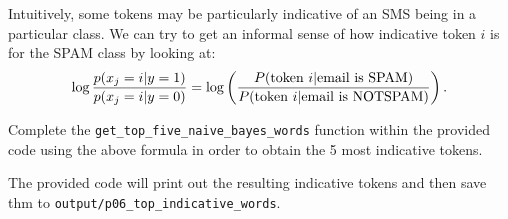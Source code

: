 \item {}
Intuitively, some tokens may be particularly indicative of an SMS being
in a particular class.  We can try to get an informal sense of how indicative
token $i$ is for the SPAM class by looking at:
\begin{equation*}
  \log \frac{p(x_j = i| y=1)}{p(x_j = i|y=0)}
  = \log\left(\frac{P(\hbox{token $i$} | \hbox{email is SPAM})}
    {P(\hbox{token $i$} | \hbox{email is NOTSPAM})}\right).
\end{equation*}

Complete the \texttt{get\_top\_five\_naive\_bayes\_words} function within the provided code using the above formula in order to obtain the 5 most indicative tokens.

The provided code will print out the resulting indicative tokens and then save thm to \texttt{output/p06\_top\_indicative\_words}.

\ifnum{} {
  
} \fi
